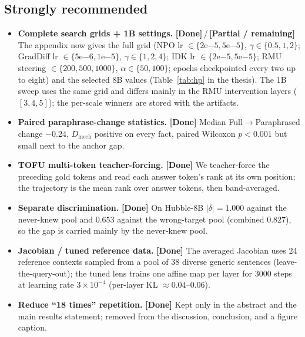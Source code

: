 \documentclass[11pt,a4paper]{article}
\newcommand{\dmech}{\ensuremath{D_{\text{mech}}}}
\newcommand{\done}{\textbf{\textcolor{black!80}{[Done]}}}
\newcommand{\pend}{\textbf{\textcolor{black!55}{[Partial / remaining]}}}
\begin{document}
\subsection*{Strongly recommended}
\begin{itemize}
\item \textbf{Complete search grids + 1B settings.} \done{}\,/\,\pend{} The appendix now gives the full
grid (NPO lr $\in\{2\mathrm{e}{-5},5\mathrm{e}{-5}\}$, $\gamma\in\{0.5,1,2\}$; GradDiff lr
$\in\{5\mathrm{e}{-6},1\mathrm{e}{-5}\}$, $\gamma\in\{1,2,4\}$; IDK lr $\in\{2\mathrm{e}{-5},5\mathrm{e}{-5}\}$;
RMU steering $\in\{200,500,1000\}$, $\alpha\in\{50,100\}$; epochs checkpointed every two up to eight) and the
selected 8B values (Table~\ref{tab:hp} in the thesis). The 1B sweep uses the same grid and differs mainly in
the RMU intervention layers ($[3,4,5]$); the per-scale winners are stored with the artifacts.
\item \textbf{Paired paraphrase-change statistics.} \done{} Median Full$\to$Paraphrased change $-0.24$,
\dmech{} positive on every fact, paired Wilcoxon $p<0.001$ but small next to the anchor gap.
\item \textbf{TOFU multi-token teacher-forcing.} \done{} We teacher-force the preceding gold tokens and read
each answer token's rank at its own position; the trajectory is the mean rank over answer tokens, then
band-averaged.
\item \textbf{Separate discrimination.} \done{} On Hubble-8B $|\delta|=1.000$ against the never-knew pool
and $0.653$ against the wrong-target pool (combined $0.827$), so the gap is carried mainly by the never-knew
pool.
\item \textbf{Jacobian / tuned reference data.} \done{} The averaged Jacobian uses $24$ reference contexts
sampled from a pool of $38$ diverse generic sentences (leave-the-query-out); the tuned lens trains one
affine map per layer for $3000$ steps at learning rate $3\times10^{-4}$ (per-layer KL $\approx0.04$--$0.06$).
\item \textbf{Reduce ``18 times'' repetition.} \done{} Kept only in the abstract and the main results
statement; removed from the discussion, conclusion, and a figure caption.
\end{itemize}
\end{document}
